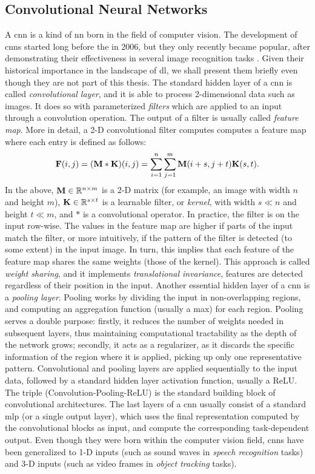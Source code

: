 \subsection{Convolutional Neural Networks}
A \gls{cnn} \citep{lecun1995convolutionalnn} is a kind of \gls{nn} born in the field of computer vision. The development of \glspl{cnn} started long before the  in 2006, but they only recently became popular, after demonstrating their effectiveness in several image recognition tasks \citep{krizhevsky2017imagenet}. Given their historical importance in the landscape of \gls{dl}, we shall present them briefly even though they are not part of this thesis. The standard hidden layer of a \gls{cnn} is called \emph{convolutional layer}, and it is able to process 2-dimensional data such as images. It does so with parameterized \emph{filters} which are applied to an input through a convolution operation. The output of a filter is usually called \emph{feature map}. More in detail, a 2-D convolutional filter computes computes a feature map where each entry is defined as follows:
$$\Matrix{F}(i, j) = (\Matrix{M} * \Matrix{K})(i, j) = \sum_{i=1}^{n} \sum_{j=1}^{m} \Matrix{M}(i+s, j+t)\Matrix{K}(s,t).$$
In the above, $\Matrix{M} \in \Real^{n \times m}$ is a 2-D matrix (for example, an image with width $n$ and height $m$), $\Matrix{K} \in \Real^{s \times t}$ is a learnable filter, or \emph{kernel}, with width $s \ll n$ and height $t \ll m$, and $*$ is a convolutional operator. In practice, the filter is  on the input row-wise. The values in the feature map are higher if parts of the input match the filter, or more intuitively, if the pattern of the filter is detected (to some extent) in the input image. In turn, this implies that each feature of the feature map shares the same weights (those of the kernel). This approach is called \emph{weight sharing}, and it implements \emph{translational invariance}, \ie features are detected regardless of their position in the input. Another essential hidden layer of a \gls{cnn} is a \emph{pooling layer}. Pooling works by dividing the input in non-overlapping regions, and computing an aggregation function (usually a max) for each region. Pooling serves a double purpose: firstly, it reduces the number of weights needed in subsequent layers, thus maintaining computational tractability as the depth of the network grows; secondly, it acts as a regularizer, as it discards the specific information of the region where it is applied, picking up only one representative pattern. Convolutional and pooling layers are applied sequentially to the input data, followed by a standard hidden layer activation function, usually a ReLU. The triple (Convolution-Pooling-ReLU) is the standard building block of convolutional architectures. The last layers of a \gls{cnn} usually consist of a standard \gls{mlp} (or a single output layer), which uses the final representation computed by the convolutional blocks as input, and compute the corresponding task-dependent output. Even though they were born within the computer vision field, \glspl{cnn} have been generalized to 1-D inputs (such as sound waves in \emph{speech recognition} tasks) and 3-D inputs (such as video frames in \emph{object tracking} tasks).

